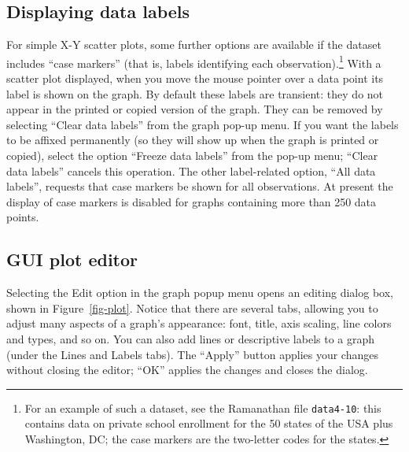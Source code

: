 \subsection{Displaying data labels}
\label{plot-labels}

For simple X-Y scatter plots, some further options are available if
the dataset includes ``case markers'' (that is, labels identifying
each observation).\footnote{For an example of such a dataset, see the
  Ramanathan file \verb+data4-10+: this contains data on private
  school enrollment for the 50 states of the USA plus Washington, DC;
  the case markers are the two-letter codes for the states.} With a
scatter plot displayed, when you move the mouse pointer over a data
point its label is shown on the graph.  By default these labels are
transient: they do not appear in the printed or copied version of the
graph.  They can be removed by selecting ``Clear data labels'' from
the graph pop-up menu. If you want the labels to be affixed
permanently (so they will show up when the graph is printed or
copied), select the option ``Freeze data labels'' from the pop-up
menu; ``Clear data labels'' cancels this operation.  The other
label-related option, ``All data labels'', requests that case markers
be shown for all observations.  At present the display of case markers
is disabled for graphs containing more than 250 data points.


\subsection{GUI plot editor}
\label{plot-editor}

Selecting the \textsf{Edit} option in the graph popup menu opens
an editing dialog box, shown in Figure~\ref{fig-plot}.  Notice that
there are several tabs, allowing you to adjust many aspects of
a graph's appearance: font, title, axis scaling, line colors
and types, and so on.  You can also add lines or descriptive
labels to a graph (under the Lines and Labels tabs).  The
``Apply'' button applies your changes without closing the
editor; ``OK'' applies the changes and closes the dialog.

